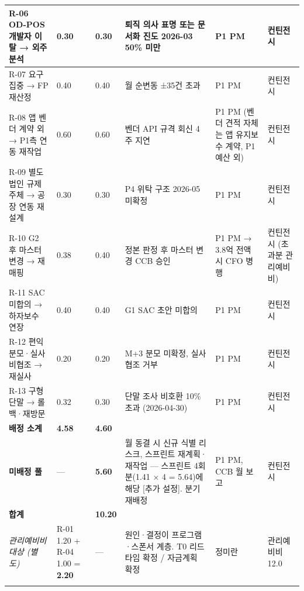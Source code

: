\documentclass[10pt,a4paper]{article}
\begin{document}
{\begin{longtable}{|L{74mm}|C{20mm}|C{16mm}|L{62mm}|L{44mm}|L{32mm}|}
R-06 OD-POS 개발자 이탈 → 외주 분석 & 0.30 & 0.30 & 퇴직 의사 표명 또는 문서화 진도 2026-03 50\% 미만 & P1 PM & 컨틴전시 \\ \hline
R-07 요구 집중 → FP 재산정 & 0.40 & 0.40 & 월 순변동 ±35건 초과 & P1 PM & 컨틴전시 \\ \hline
R-08 앱 벤더 계약 외 → P1측 연동 재작업 & 0.60 & 0.60 & 벤더 API 규격 회신 4주 지연 & P1 PM (벤더 견적 자체는 앱 유지보수 계약, P1 예산 외) & 컨틴전시 \\ \hline
R-09 별도 법인 규제 주체 → 공장 연동 재설계 & 0.30 & 0.30 & P4 위탁 구조 2026-05 미확정 & P1 PM & 컨틴전시 \\ \hline
R-10 G2 후 마스터 변경 → 재매핑 & 0.38 & 0.40 & 정본 판정 후 마스터 변경 CCB 승인 & P1 PM → 3.8억 전액 시 CFO 병행 & 컨틴전시 (초과분 관리예비비) \\ \hline
R-11 SAC 미합의 → 하자보수 연장 & 0.40 & 0.40 & G1 SAC 초안 미합의 & P1 PM & 컨틴전시 \\ \hline
R-12 편익 분모·실사 비협조 → 재실사 & 0.20 & 0.20 & M+3 분모 미확정, 실사 협조 거부 & P1 PM & 컨틴전시 \\ \hline
R-13 구형 단말 → 롤백·재방문 & 0.32 & 0.30 & 단말 조사 비호환 10\% 초과 (2026-04-30) & P1 PM & 컨틴전시 \\ \hline
\textbf{배정 소계} & \textbf{4.58} & \textbf{4.60} & & & \\ \hline
\textbf{미배정 풀} & — & \textbf{5.60} & 월 동결 시 신규 식별 리스크, 스프린트 재계획·재작업 — 스프린트 4회분(1.41 × 4 = 5.64)에 해당 [추가 설정]. 분기 재배정 & P1 PM, CCB 월 보고 & 컨틴전시 \\ \hline
\textbf{합계} & & \textbf{10.20} & & & \\ \hline
\textit{관리예비비 대상 (별도)} & R-01 1.20 + R-04 1.00 = \textbf{2.20} & — & 원인·결정이 프로그램·스폰서 계층. T0 리드타임 확정 / 자금계획 확정 & 정미란 & 관리예비비 12.0 \\ \hline
\fi
\end{longtable}}
\landscapeoff
\end{document}

